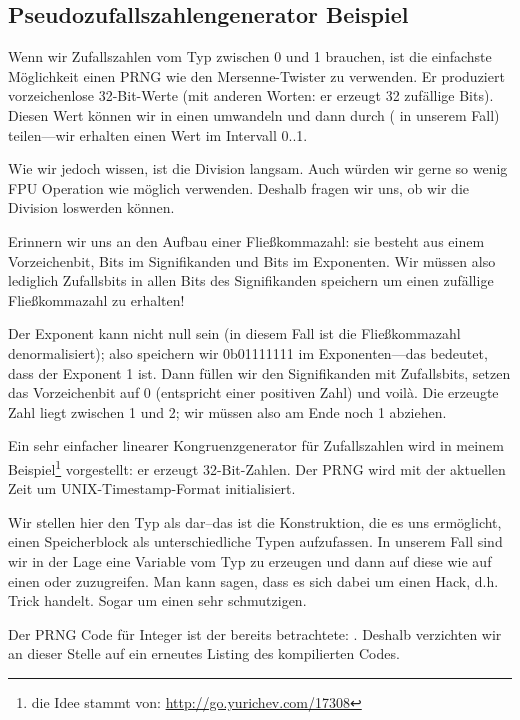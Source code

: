 \subsection{Pseudozufallszahlengenerator Beispiel}
\label{FPU_PRNG}
Wenn wir Zufallszahlen vom Typ \Tfloat zwischen 0 und 1 brauchen, ist die einfachste Möglichkeit einen \ac{PRNG} wie den
Mersenne-Twister zu verwenden.
Er produziert vorzeichenlose 32-Bit-Werte (mit anderen Worten: er erzeugt 32 zufällige Bits).
Diesen Wert können wir in einen \Tfloat umwandeln und dann durch  ( in unserem Fall)
teilen---wir erhalten einen Wert im Intervall 0..1.

Wie wir jedoch wissen, ist die Division langsam.
Auch würden wir gerne so wenig FPU Operation wie möglich verwenden.
Deshalb fragen wir uns, ob wir die Division loswerden können.

Erinnern wir uns an den Aufbau einer Fließkommazahl: sie besteht aus einem Vorzeichenbit, Bits im Signifikanden und Bits
im Exponenten.
Wir müssen also lediglich Zufallsbits in allen Bits des Signifikanden speichern um einen zufällige Fließkommazahl zu
erhalten!

Der Exponent kann nicht null sein (in diesem Fall ist die Fließkommazahl denormalisiert); also speichern wir 0b01111111
im Exponenten---das bedeutet, dass der Exponent 1 ist.
Dann füllen wir den Signifikanden mit Zufallsbits, setzen das Vorzeichenbit auf 0 (entspricht einer positiven Zahl) und
voilà.
Die erzeugte Zahl liegt zwischen 1 und 2; wir müssen also am Ende noch 1 abziehen.

\newcommand{\URLXOR}{\url{http://go.yurichev.com/17308}}
Ein sehr einfacher linearer Kongruenzgenerator für Zufallszahlen wird in meinem Beispiel\footnote{die Idee stammt von:
\URLXOR} vorgestellt: er erzeugt 32-Bit-Zahlen.
Der \ac{PRNG} wird mit der aktuellen Zeit um UNIX-Timestamp-Format initialisiert.

Wir stellen hier den Typ \Tfloat als  dar--das ist die \CCpp Konstruktion, die es uns ermöglicht, einen
Speicherblock als unterschiedliche Typen aufzufassen.
In unserem Fall sind wir in der Lage eine Variable vom Typ  zu erzeugen und dann auf diese wie auf einen
\Tfloat oder  zuzugreifen.
Man kann sagen, dass es sich dabei um einen Hack, d.h. Trick handelt. Sogar um einen sehr schmutzigen.

Der \ac{PRNG} Code für Integer ist der bereits betrachtete: .
Deshalb verzichten wir an dieser Stelle auf ein erneutes Listing des kompilierten Codes.

